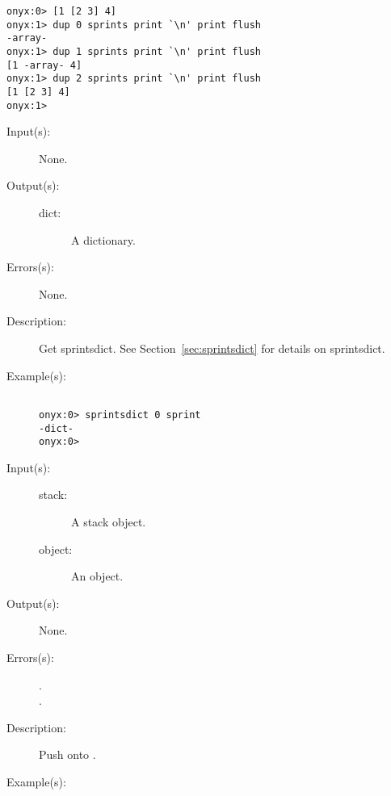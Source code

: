 \begin{description}
\begin{description}
\begin{verbatim}
onyx:0> [1 [2 3] 4]
onyx:1> dup 0 sprints print `\n' print flush
-array-
onyx:1> dup 1 sprints print `\n' print flush
[1 -array- 4]
onyx:1> dup 2 sprints print `\n' print flush
[1 [2 3] 4]
onyx:1>
		\end{verbatim}
	\end{description}
\label{systemdict:sprintsdict}
\item[{\onyxop{--}{sprintsdict}{dict}}: ]
	\begin{description}\item[]
	\item[Input(s): ] None.
	\item[Output(s): ]
		\begin{description}\item[]
		\item[dict: ]
			A dictionary.
		\end{description}
	\item[Errors(s): ] None.
	\item[Description: ]
		Get sprintsdict.  See Section~\ref{sec:sprintsdict} for details
		on sprintsdict.
	\item[Example(s): ]\begin{verbatim}

onyx:0> sprintsdict 0 sprint
-dict-
onyx:0>
		\end{verbatim}
	\end{description}
\label{systemdict:spush}
\item[{\onyxop{stack object}{spush}{--}}: ]
	\begin{description}\item[]
	\item[Input(s): ]
		\begin{description}\item[]
		\item[stack: ]
			A stack object.
		\item[object: ]
			An object.
		\end{description}
	\item[Output(s): ] None.
	\item[Errors(s): ]
		\begin{description}\item[]
		\item[.]
		\item[.]
		\end{description}
	\item[Description: ]
		Push  onto .
	\item[Example(s): ]\begin{verbatim}


\end{verbatim}
\end{description}
\end{description}
